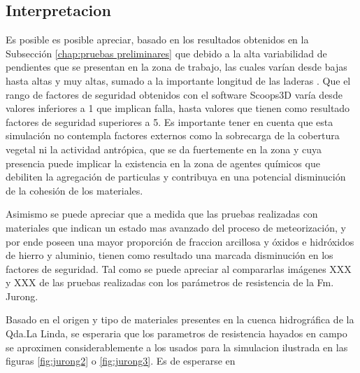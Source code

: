 \subsection{Interpretacion}
Es posible es posible apreciar, basado en los resultados obtenidos en la Subsecci\'on \ref{chap:pruebas preliminares} que debido a la alta variabilidad de pendientes que se presentan en la zona de trabajo, las cuales var\'ian desde bajas hasta altas y muy altas, sumado a la importante longitud de las laderas . Que el rango de factores de seguridad obtenidos con el software Scoops3D var\'ia desde valores inferiores a 1 que implican falla, hasta valores que tienen como resultado factores de seguridad superiores a 5.
Es importante tener en cuenta que esta simulaci\'on no contempla factores externos como la sobrecarga de la cobertura vegetal ni la actividad antr\'opica, que se da fuertemente en la zona y cuya presencia puede implicar la existencia en la zona de agentes qu\'imicos que debiliten la agregaci\'on de particulas y contribuya en una potencial disminuci\'on de la cohesi\'on de los materiales.

Asimismo se puede apreciar que a medida que las pruebas realizadas con materiales que indican un estado mas avanzado del proceso de meteorizaci\'on, y por ende poseen una mayor proporci\'on de fraccion arcillosa y \'oxidos e hidr\'oxidos de hierro y aluminio, tienen como resultado una marcada disminuci\'on en los factores de seguridad. Tal como se puede apreciar al compararlas im\'agenes XXX y XXX de las pruebas realizadas con los parámetros de resistencia de la Fm. Jurong.

Basado en el origen y tipo de materiales presentes en la cuenca hidrogr\'afica de la Qda.La Linda, se esperaria que los parametros de resistencia hayados en campo se aproximen considerablemente a los usados para la simulacion ilustrada en las figuras \ref{fig:jurong2} o \ref{fig:jurong3}. Es de esperarse en 

